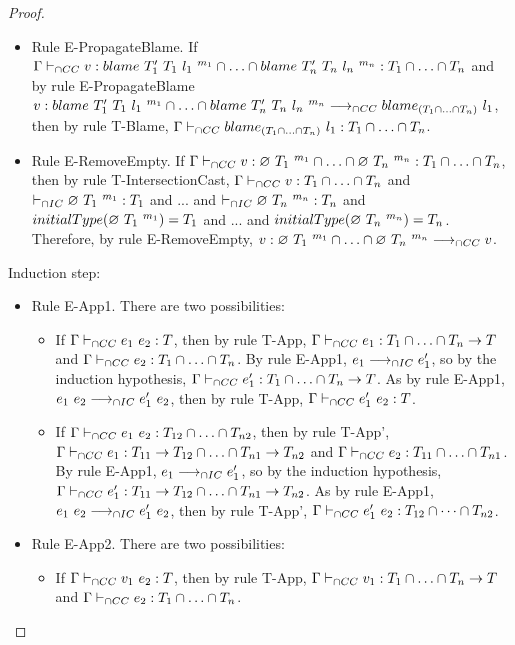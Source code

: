 \documentclass[a4paper]{article}
\begin{document}
\begin{proof}
\begin{itemize}
    \item Rule E-PropagateBlame.
    If $\Gamma \vdash_{\cap CC} v : blame\ T_1'\ T_1\ l_1\ ^{m_1} \cap \ldots \cap blame\ T_n'\ T_n\ l_n\ ^{m_n} : T_1 \cap \ldots \cap T_n$ and by rule E-PropagateBlame $v : blame\ T_1'\ T_1\ l_1\ ^{m_1} \cap \ldots \cap blame\ T_n'\ T_n\ l_n\ ^{m_n} \longrightarrow_{\cap CC} blame_{(T_1 \cap \ldots \cap T_n)}\ l_1$, then by rule T-Blame, $\Gamma \vdash_{\cap CC} blame_{(T_1 \cap \ldots \cap T_n)}\ l_1 : T_1 \cap \ldots \cap T_n$.
    \item Rule E-RemoveEmpty.
    If $\Gamma \vdash_{\cap CC} v : \varnothing\ T_1\ ^{m_1} \cap \ldots \cap \varnothing\ T_n\ ^{m_n} : T_1 \cap \ldots \cap T_n$, then by rule T-IntersectionCast, $\Gamma \vdash_{\cap CC} v : T_1 \cap \ldots \cap T_n$ and $\vdash_{\cap IC} \varnothing\ T_1\ ^{m_1} : T_1$ and ... and $\vdash_{\cap IC} \varnothing\ T_n\ ^{m_n} : T_n$ and $initialType(\varnothing\ T_1\ ^{m_1}) = T_1$ and ... and $initialType(\varnothing\ T_n\ ^{m_n}) = T_n$.
    Therefore, by rule E-RemoveEmpty, $v : \varnothing\ T_1\ ^{m_1} \cap \ldots \cap \varnothing\ T_n\ ^{m_n} \longrightarrow_{\cap CC} v$.
\end{itemize}
Induction step:
\begin{itemize}
    \item Rule E-App1. There are two possibilities:
    \begin{itemize}
        \item If $\Gamma \vdash_{\cap CC} e_1\ e_2 : T$, then by rule T-App, $\Gamma \vdash_{\cap CC} e_1 : T_1 \cap \ldots \cap T_n \rightarrow T$ and $\Gamma \vdash_{\cap CC} e_2 : T_1 \cap \ldots \cap T_n$.
        By rule E-App1, $e_1 \longrightarrow_{\cap IC} e_1'$, so by the induction hypothesis, $\Gamma \vdash_{\cap CC} e_1' : T_1 \cap \ldots \cap T_n \rightarrow T$.
        As by rule E-App1, $e_1\ e_2 \longrightarrow_{\cap IC} e_1'\ e_2$, then by rule T-App, $\Gamma \vdash_{\cap CC} e_1'\ e_2 : T$.
        \item If $\Gamma \vdash_{\cap CC} e_1\ e_2 : T_{12} \cap \ldots \cap T_{n2}$, then by rule T-App', $\Gamma \vdash_{\cap CC} e_1 : T_{11} \rightarrow T_{12} \cap \ldots \cap T_{n1} \rightarrow T_{n2}$ and $\Gamma \vdash_{\cap CC} e_2 : T_{11} \cap \ldots \cap T_{n1}$.
        By rule E-App1, $e_1 \longrightarrow_{\cap IC} e_1'$, so by the induction hypothesis, $\Gamma \vdash_{\cap CC} e_1' : T_{11} \rightarrow T_{12} \cap \ldots \cap T_{n1} \rightarrow T_{n2}$.
        As by rule E-App1, $e_1\ e_2 \longrightarrow_{\cap IC} e_1'\ e_2$, then by rule T-App', $\Gamma \vdash_{\cap CC} e_1'\ e_2 : T_{12} \cap \dots \cap T_{n2}$.
    \end{itemize}
    \item Rule E-App2. There are two possibilities:
    \begin{itemize}
        \item If $\Gamma \vdash_{\cap CC} v_1\ e_2 : T$, then by rule T-App, $\Gamma \vdash_{\cap CC} v_1 : T_1 \cap \ldots \cap T_n \rightarrow T$ and $\Gamma \vdash_{\cap CC} e_2 : T_1 \cap \ldots \cap T_n$.

\end{itemize}
\end{itemize}
\end{proof}
\end{document}
